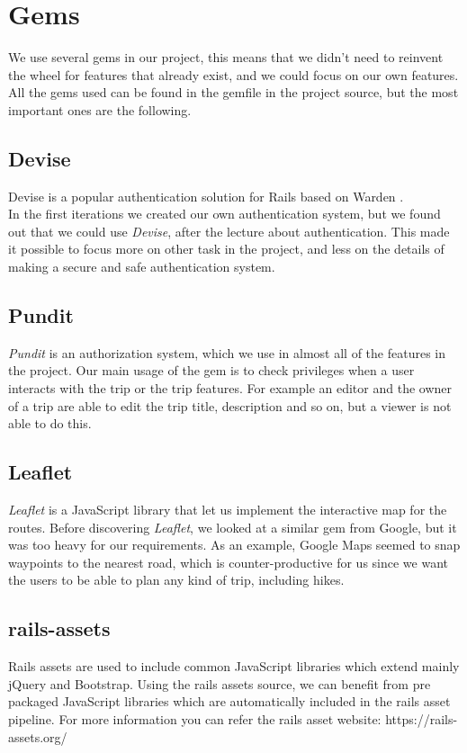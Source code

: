 \documentclass[a4paper]{article}
\begin{document}
\section{Gems}
We use several gems in our project, this means that we didn't need to reinvent the wheel for features that already exist, and we could focus on our own features. All the gems used can be found in the gemfile in the project source, but the most important ones are the following.
\subsection{Devise}
Devise is a popular authentication solution for Rails based on Warden \cite{devise}. \\
In the first iterations we created our own authentication system, but we found out that we could use \textit{Devise}, after the lecture about authentication. This made it possible to focus more on other task in the project, and less on the details of making a secure and safe authentication system. 

\subsection{Pundit}
\textit{Pundit} is an authorization system\cite{pundit}, which we use in almost all of the features in the project. Our main usage of the gem is to check privileges when a user interacts with the trip or the trip features. For example an editor and the owner of a trip are able to edit the trip title, description and so on, but a viewer is not able to do this. 

\subsection{Leaflet}
\textit{Leaflet}\cite{leaflet} is a JavaScript library that let us implement the interactive map for the routes. Before discovering \textit{Leaflet}, we looked at a similar gem from Google, but it was too heavy for our requirements. As an example, Google Maps seemed to snap waypoints to the nearest road, which is counter-productive for us since we want the users to be able to plan any kind of trip, including hikes.

\subsection{rails-assets}
Rails assets are used to include common JavaScript libraries which extend mainly jQuery and Bootstrap. Using the rails assets source, we can benefit from pre packaged JavaScript libraries which are automatically included in the rails asset pipeline. For more information you can refer the rails asset website: https://rails-assets.org/
\end{document}

